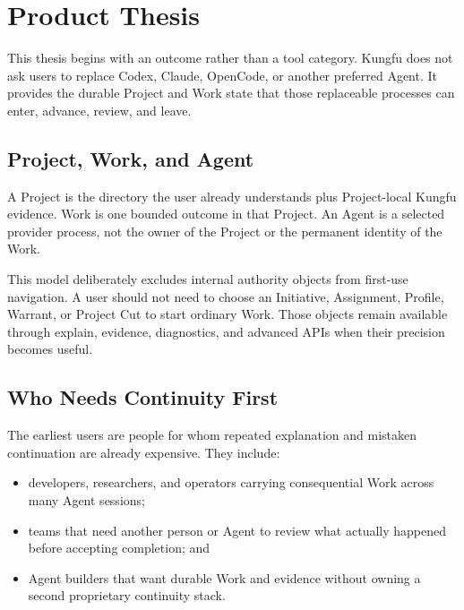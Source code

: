 \section{Product Thesis}


This thesis begins with an outcome rather than a tool category. Kungfu does
not ask users to replace Codex, Claude, OpenCode, or another preferred Agent.
It provides the durable Project and Work state that those replaceable
processes can enter, advance, review, and leave.

\subsection{Project, Work, and Agent}

A Project is the directory the user already understands plus Project-local
Kungfu evidence. Work is one bounded outcome in that Project. An Agent is a
selected provider process, not the owner of the Project or the permanent
identity of the Work.

This model deliberately excludes internal authority objects from first-use
navigation. A user should not need to choose an Initiative, Assignment,
Profile, Warrant, or Project Cut to start ordinary Work. Those objects remain
available through explain, evidence, diagnostics, and advanced APIs when their
precision becomes useful.

\subsection{Who Needs Continuity First}

The earliest users are people for whom repeated explanation and mistaken
continuation are already expensive. They include:

\begin{itemize}[leftmargin=*]
  \item developers, researchers, and operators carrying consequential Work
  across many Agent sessions;
  \item teams that need another person or Agent to review what actually
  happened before accepting completion; and
  \item Agent builders that want durable Work and evidence without owning a
  second proprietary continuity stack.
\end{itemize}

